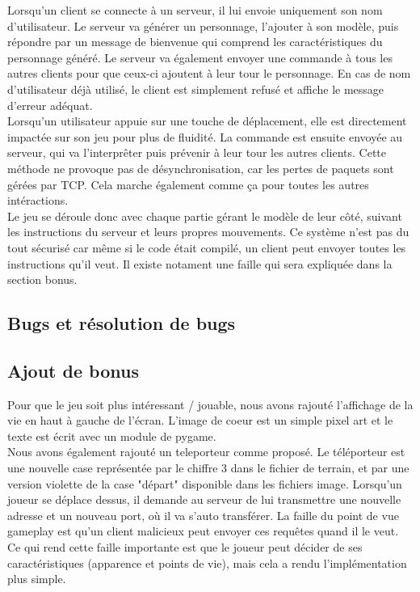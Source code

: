 \documentclass[12pt]{article}
\begin{document}
Lorsqu'un client se connecte à un serveur, il lui envoie uniquement son nom d'utilisateur. Le serveur va générer un personnage, l'ajouter à son modèle, puis répondre par un message de bienvenue qui comprend les caractéristiques du personnage généré. Le serveur va également envoyer une commande à tous les autres clients pour que ceux-ci ajoutent à leur tour le personnage. En cas de nom d'utilisateur déjà utilisé, le client est simplement refusé et affiche le message d'erreur adéquat.
\\

Lorsqu'un utilisateur appuie sur une touche de déplacement, elle est directement impactée sur son jeu pour plus de fluidité. La commande est ensuite envoyée au serveur, qui va l'interprêter puis prévenir à leur tour les autres clients. Cette méthode ne provoque pas de désynchronisation, car les pertes de paquets sont gérées par TCP. Cela marche également comme ça pour toutes les autres intéractions.
\\

Le jeu se déroule donc avec chaque partie gérant le modèle de leur côté, suivant les instructions du serveur et leurs propres mouvements. Ce système n'est pas du tout sécurisé car même si le code était compilé, un client peut envoyer toutes les instructions qu'il veut. Il existe notament une faille qui sera expliquée dans la section bonus.
\subsection{Bugs et résolution de bugs}

\subsection{Ajout de bonus}
Pour que le jeu soit plus intéressant / jouable, nous avons rajouté l'affichage de la vie en haut à gauche de l'écran. L'image de coeur est un simple pixel art et le texte est écrit avec un module de pygame.
\\

Nous avons également rajouté un teleporteur comme proposé. Le téléporteur est une nouvelle case représentée par le chiffre 3 dans le fichier de terrain, et par une version violette de la case "départ" disponible dans les fichiers image. Lorsqu'un joueur se déplace dessus, il demande au serveur de lui transmettre une nouvelle adresse et un nouveau port, où il va s'auto transférer. La faille du point de vue gameplay est qu'un client malicieux peut envoyer ces requêtes quand il le veut. Ce qui rend cette faille importante est que le joueur peut décider de ses caractéristiques (apparence et points de vie), mais cela a rendu l'implémentation plus simple.
\\
\end{document}
